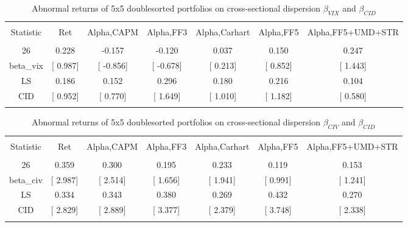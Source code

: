 \documentclass[16pt]{article}
\begin{document}
\begin{table}[!htbp] \centering 
  \caption{Abnormal returns of 5x5 doublesorted portfolios on cross-sectional dispersion $\beta_{VIX}$ and $\beta_{CID}$} 
  \label{} 
\begin{tabular}{@{\extracolsep{5pt}} ccccccc} 
\\[-1.8ex]\hline 
\hline \\[-1.8ex] 
Statistic & Ret & Alpha,CAPM & Alpha,FF3 & Alpha,Carhart & Alpha,FF5 & Alpha,FF5+UMD+STR \\ 
\hline \\[-1.8ex] 
26 & 0.228 & -0.157 & -0.120 & 0.037 & 0.150 & 0.247 \\ 
beta\_vix & [ 0.987] & [ -0.856] & [ -0.678] & [ 0.213] & [ 0.852] & [ 1.443] \\ 
LS & 0.186 & 0.152 & 0.296 & 0.180 & 0.216 & 0.104 \\ 
CID & [ 0.952] & [ 0.770] & [ 1.649] & [ 1.010] & [ 1.182] & [ 0.580] \\ 
\hline \\[-1.8ex] 
\end{tabular} 
\end{table}

\begin{table}[!htbp] \centering 
  \caption{Abnormal returns of 5x5 doublesorted portfolios on cross-sectional dispersion $\beta_{CIV}$ and $\beta_{CID}$} 
  \label{} 
\begin{tabular}{@{\extracolsep{5pt}} ccccccc} 
\\[-1.8ex]\hline 
\hline \\[-1.8ex] 
Statistic & Ret & Alpha,CAPM & Alpha,FF3 & Alpha,Carhart & Alpha,FF5 & Alpha,FF5+UMD+STR \\ 
\hline \\[-1.8ex] 
26 & 0.359 & 0.300 & 0.195 & 0.233 & 0.119 & 0.153 \\ 
beta\_civ & [ 2.987] & [ 2.514] & [ 1.656] & [ 1.941] & [ 0.991] & [ 1.241] \\ 
LS & 0.334 & 0.343 & 0.380 & 0.269 & 0.432 & 0.270 \\ 
CID & [ 2.829] & [ 2.889] & [ 3.377] & [ 2.379] & [ 3.748] & [ 2.338] \\ 
\hline \\[-1.8ex] 
\end{tabular} 
\end{table}
\end{document}
